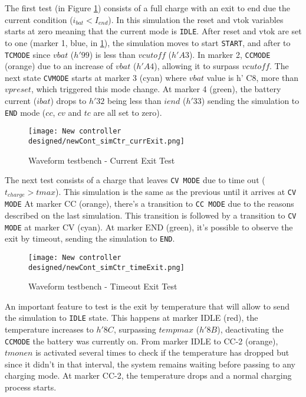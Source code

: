 \documentclass[12pt]{article}
\begin{document}
The first test (in Figure \ref{fig:currExit}) consists of a full charge with an exit to end due the current condition ($ i_{bat} < I _{end}$). In this simulation the reset and vtok variables starts at zero meaning that the current mode is \texttt{IDLE}. After reset and vtok are set to one (marker 1, blue, in \ref{fig:currExit}), the simulation moves to start \texttt{START}, and after to \texttt{TCMODE} since $vbat$ ($h'99$) is less than $vcutoff$ ($h'A3$). In marker 2, \texttt{CCMODE} (orange) due to an increase of $vbat$ ($h'A4$), allowing it to surpass $vcutoff$. The next state \texttt{CVMODE} starts at marker 3 (cyan) where $vbat$ value is h' C8, more than $vpreset$, which triggered this mode change. At marker 4 (green), the battery current ($ibat$) drops to $h'32$ being less than $iend$ ($h'33$) sending the simulation to \texttt{END} mode ($cc$, $cv$ and $tc$ are all set to zero).

\begin{figure}[H]
    \centering
    \texttt{[image: New controller designed/newCont\_simCtr\_currExit.png]}
    \caption{Waveform testbench - Current Exit Test}
    \label{fig:currExit}
\end{figure}

The next test consists of a charge that leaves \texttt{CV MODE} due to time out ($t_{charge} > tmax$). This simulation is the same as the previous until it arrives at \texttt{CV MODE} At marker CC (orange), there's a transition to \texttt{CC MODE} due to the reasons described on the last simulation. This transition is followed by a transition to \texttt{CV MODE} at marker CV (cyan). At marker END (green), it's possible to observe the exit by timeout, sending the simulation to \texttt{END}. 

\begin{figure}[H]
    \centering
    \texttt{[image: New controller designed/newCont\_simCtr\_timeExit.png]}
    \caption{Waveform testbench - Timeout Exit Test}
    \label{fig:timeExit}
\end{figure}

An important feature to test is the exit by temperature that will allow to send the simulation to \texttt{IDLE} state. This happens at marker IDLE (red), the temperature increases to $h'8C$, surpassing $tempmax$ ($h' 8B$), deactivating the \texttt{CCMODE} the battery was currently on. From marker IDLE to CC-2 (orange), $tmonen$ is activated several times to check if the temperature has dropped but since it didn't in that interval, the system remains waiting before passing to any charging mode. At marker CC-2, the temperature drops and a normal charging process starts.
\end{document}
